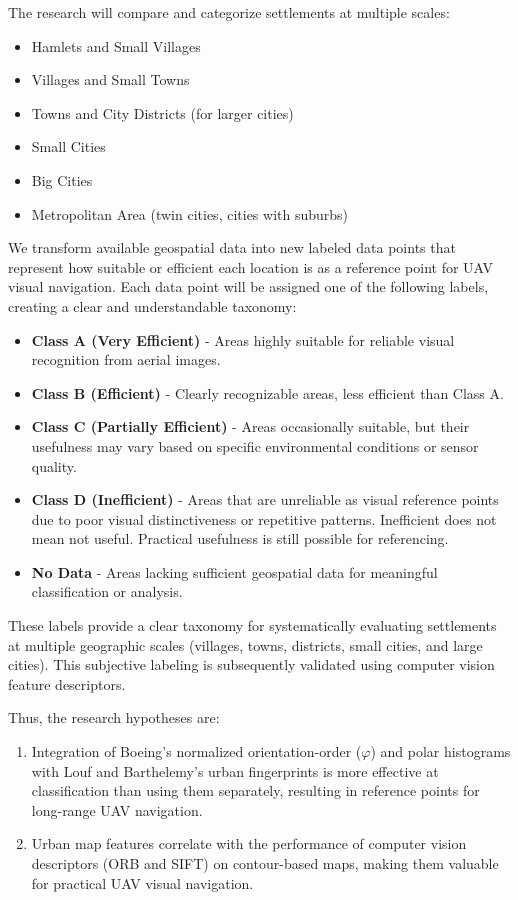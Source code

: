 The research will compare and categorize settlements at multiple scales:

\begin{itemize}
    \item Hamlets and Small Villages
    \item Villages and Small Towns
    \item Towns and City Districts (for larger cities)
    \item Small Cities
    \item Big Cities
    \item Metropolitan Area (twin cities, cities with suburbs)
\end{itemize}


We transform available geospatial data into new labeled data points that represent how suitable or efficient each location is as a reference point for UAV visual navigation. Each data point will be assigned one of the following labels, creating a clear and understandable taxonomy:


\begin{itemize}
    \item \textbf{Class A (Very Efficient)} - Areas highly suitable for reliable visual recognition from aerial images.
    \item \textbf{Class B (Efficient)} - Clearly recognizable areas, less efficient than Class A.
    \item \textbf{Class C (Partially Efficient)} - Areas occasionally suitable, but their usefulness may vary based on specific environmental conditions or sensor quality.
    \item \textbf{Class D (Inefficient)} - Areas that are unreliable as visual reference points due to poor visual distinctiveness or repetitive patterns. Inefficient does not mean not useful. Practical usefulness is still possible for referencing.
    \item \textbf{No Data} - Areas lacking sufficient geospatial data for meaningful classification or analysis.
\end{itemize}

These labels provide a clear taxonomy for systematically evaluating settlements at multiple geographic scales (villages, towns, districts, small cities, and large cities). This subjective labeling is subsequently validated using computer vision feature descriptors.


Thus, the research hypotheses are:

\begin{enumerate}

    \item Integration of Boeing's normalized orientation-order ($\varphi$) and polar histograms with Louf and Barthelemy's urban fingerprints is more effective at classification than using them separately, resulting in reference points for long-range UAV navigation.

    \item Urban map features correlate with the performance of computer vision descriptors (ORB and SIFT) on contour-based maps, making them valuable for practical UAV visual navigation.

\end{enumerate}

